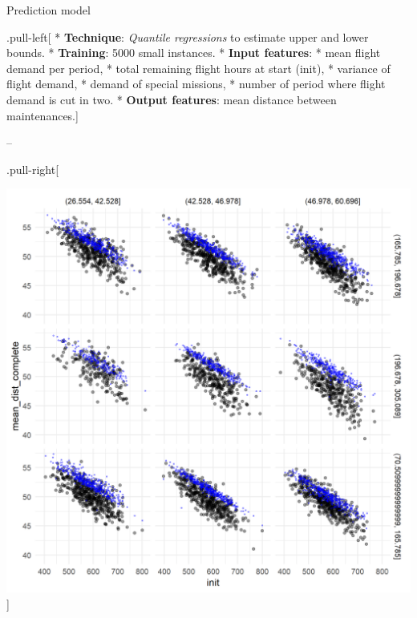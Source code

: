 \begin{frame}

\begin{block}{Prediction model}

.pull-left{[} * \textbf{Technique}: \emph{Quantile regressions} to
estimate upper and lower bounds. * \textbf{Training}: 5000 small
instances. * \textbf{Input features}: * mean flight demand per period, *
total remaining flight hours at start (init), * variance of flight
demand, * demand of special missions, * number of period where flight
demand is cut in two. * \textbf{Output features}: mean distance between
maintenances.{]}

--

.pull-right{[}

\includegraphics[width=1\linewidth]{QuantReg_mean_consum_upper_mean_dist_complete_IT000125_20190716}
{]}

\end{block}

\end{frame}


